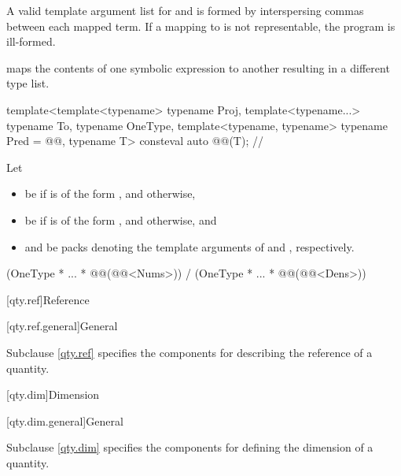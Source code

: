 \begin{itemdescr}
\pnum
\remarks
A valid template argument list for  and 
is formed by interspersing commas between each mapped term.
If a mapping to  is not representable,
the program is ill-formed.
\end{itemdescr}

\pnum
{} maps the contents of one symbolic expression to another resulting in a different type list.

\begin{itemdecl}
template<template<typename> typename Proj, template<typename...> typename To, typename OneType,
         template<typename, typename> typename Pred = @@, typename T>
consteval auto @@(T);  // \expos
\end{itemdecl}

\begin{itemdescr}
\pnum
Let
\begin{itemize}
\item
{} be
 if  is of the form , and
 otherwise,
\item
{} be
 if  is of the form , and
 otherwise, and
\item
{} and 
be packs denoting the template arguments of
 and , respectively.
\end{itemize}

\pnum
\returns
\begin{codeblock}
(OneType{} * ... * @@(@@<Nums>{})) /
(OneType{} * ... * @@(@@<Dens>{}))
\end{codeblock}
\end{itemdescr}

[qty.ref]{Reference}

[qty.ref.general]{General}

\pnum
Subclause \ref{qty.ref} specifies the components
for describing the reference of a quantity.

[qty.dim]{Dimension}

[qty.dim.general]{General}

\pnum
Subclause \ref{qty.dim} specifies the components
for defining the dimension of a quantity.


